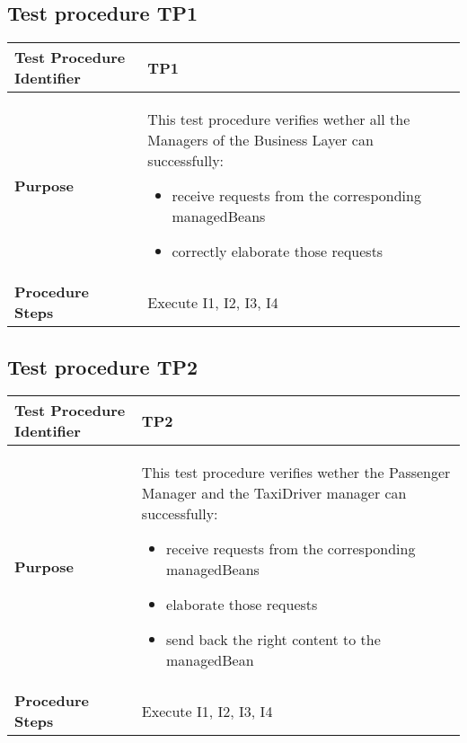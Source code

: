 \subsection{Test procedure TP1}

\begin{table}[!htbp]
\begin{center}
\begin{tabular}[t]{p{}p{}}

\hline
\textbf{Test Procedure Identifier} & TP1 \\
\hline
\textbf{Purpose} & This test procedure verifies wether all the Managers of the Business Layer can successfully:
\begin{itemize}
	\item receive requests from the corresponding managedBeans
	\item correctly elaborate those requests
\end{itemize} \\
\hline
\textbf{Procedure Steps} & Execute I1, I2, I3, I4 \\
\hline

\end{tabular}
\end{center}
\end{table}


\subsection{Test procedure TP2}

\begin{table}[!htbp]
\begin{center}
\begin{tabular}[t]{p{}p{}}

\hline
\textbf{Test Procedure Identifier} & TP2 \\
\hline
\textbf{Purpose} & This test procedure verifies wether the Passenger Manager and the TaxiDriver manager can successfully:
\begin{itemize}
	\item receive requests from the corresponding managedBeans
	\item elaborate those requests
	\item send back the right content to the managedBean
\end{itemize} \\
\hline
\textbf{Procedure Steps} & Execute I1, I2, I3, I4 \\
\hline

\end{tabular}
\end{center}
\end{table}
\clearpage
